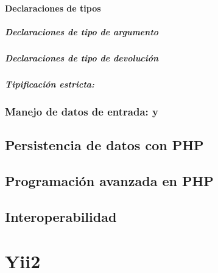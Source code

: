 \documentclass[a4paper,11pt,spanish]{sphinxmanual}
\begin{document}
\subsection{Declaraciones de tipos}
\label{\detokenize{php:declaraciones-de-tipos}}

\subsubsection{Declaraciones de tipo de argumento}
\label{\detokenize{php:declaraciones-de-tipo-de-argumento}}

\subsubsection{Declaraciones de tipo de devolución}
\label{\detokenize{php:declaraciones-de-tipo-de-devolucion}}

\subsubsection{Tipificación estricta: }
\label{\detokenize{php:tipificacion-estricta-declare-strict-types-1}}

\section{Manejo de datos de entrada:  y }
\label{\detokenize{php:manejo-de-datos-de-entrada-get-y-post}}

\chapter{Persistencia de datos con PHP}
\label{\detokenize{php:persistencia-de-datos-con-php}}

\chapter{Programación avanzada en PHP}
\label{\detokenize{php:programacion-avanzada-en-php}}

\chapter{Interoperabilidad}
\label{\detokenize{php:interoperabilidad}}

\part{Yii2}
\label{\detokenize{yii2:yii2}}\label{\detokenize{yii2::doc}}
\end{document}
